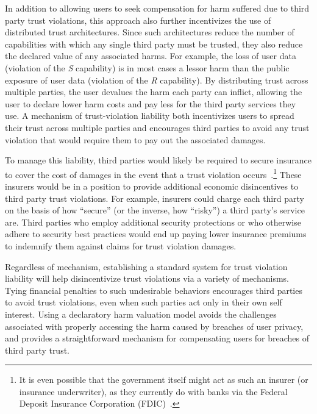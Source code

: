 In addition to allowing users to seek compensation for harm suffered
due to third party trust violations, this approach also further
incentivizes the use of distributed trust architectures. Since such
architectures reduce the number of capabilities with which any single
third party must be trusted, they also reduce the declared value of
any associated harms. For example, the loss of user data (violation of
the \emph{S} capability) is in most cases a lessor harm than the
public exposure of user data (violation of the \emph{R}
capability). By distributing trust across multiple parties, the user
devalues the harm each party can inflict, allowing the user to declare
lower harm costs and pay less for the third party services they use. A
mechanism of trust-violation liability both incentivizes users to
spread their trust across multiple parties and encourages third
parties to avoid any trust violation that would require them to pay
out the associated damages.

To manage this liability, third parties would likely be required to
secure insurance to cover the cost of damages in the event that a
trust violation occurs~\cite{ciab2015, starks2016}.\footnote{It is
  even possible that the government itself might act as such an
  insurer (or insurance underwriter), as they currently do with banks
  via the Federal Deposit Insurance Corporation (FDIC)~\cite{fdic}.}
These insurers would be in a position to provide additional economic
disincentives to third party trust violations. For example, insurers
could charge each third party on the basis of how ``secure'' (or the
inverse, how ``risky'') a third party's service are. Third parties who
employ additional security protections or who otherwise adhere to
security best practices would end up paying lower insurance premiums
to indemnify them against claims for trust violation damages.

Regardless of mechanism, establishing a standard system for trust
violation liability will help disincentivize trust violations via a
variety of mechanisms. Tying financial penalties to such undesirable
behaviors encourages third parties to avoid trust violations, even
when such parties act only in their own self interest. Using a
declaratory harm valuation model avoids the challenges associated with
properly accessing the harm caused by breaches of user privacy, and
provides a straightforward mechanism for compensating users for
breaches of third party trust.

